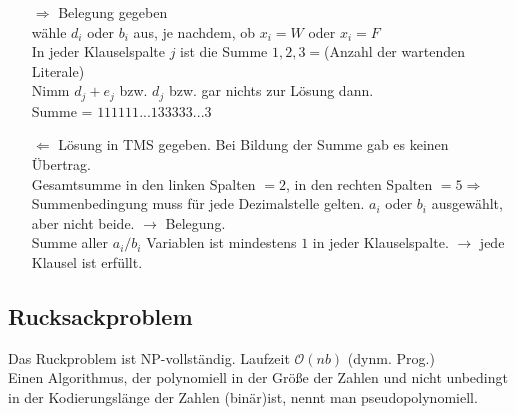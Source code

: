 \begin{enumerate}
\item[$\Rightarrow$] Belegung gegeben\\
wähle $d_i$ oder $b_i$ aus, je nachdem, ob $x_i = W$ oder $x_i = F$\\
In jeder Klauselspalte $j$ ist die Summe $1,2,3 = $(Anzahl der wartenden Literale)\\
Nimm $d_j + e_j$ bzw. $d_j$ bzw. gar nichts zur Lösung dann.\\
Summe = $111111...133333...3$
\item[$\Leftarrow$] Lösung in TMS gegeben. Bei Bildung der Summe gab es keinen Übertrag.\\
Gesamtsumme in den linken Spalten $=2$, in den rechten Spalten $=5 \Rightarrow$ Summenbedingung muss für jede Dezimalstelle gelten. $a_i$ oder $b_i$ ausgewählt, aber nicht beide. $\rightarrow$ Belegung.\\
Summe aller $a_i / b_i$ Variablen ist mindestens $1$ in jeder Klauselspalte. $\rightarrow$ jede Klausel ist erfüllt.\\ 
\end{enumerate}
\subsection{Rucksackproblem}
Das Ruckproblem ist NP-vollständig. Laufzeit $\mathcal{O}(nb)$ (dynm. Prog.)\\

Einen Algorithmus, der polynomiell in der Größe der Zahlen und nicht unbedingt in der Kodierungslänge der Zahlen (binär)ist, nennt man pseudopolynomiell.\\